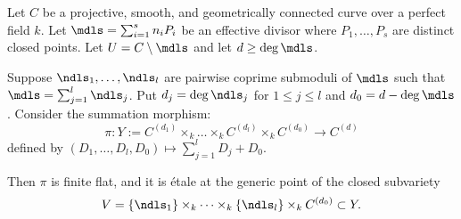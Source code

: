 \begin{lemma}\label{lemma:takeuchi_lemma}
     Let $C$ be a projective, smooth, and geometrically connected curve over a perfect field $k$.
     Let $\mdls = \sum_{i=1}^{s} n_i P_i$ be an effective divisor where $P_1, \dots, P_s$ are distinct closed points.
     Let $U = C \setminus \mdls$ and let $d \geq \deg \mdls$.

     Suppose $\ndls_1, \dots, \ndls_l$ are pairwise coprime submoduli of $\mdls$ such that $\mdls = \sum_{j=1}^l \ndls_j$.
     Put $d_j=\deg\ndls_j$ for $1\leq j\leq l$ and $d_0=d-\deg\mdls$.
     Consider the summation morphism:
     \[
     \pi : Y:=C^{(d_1)} \times_k \dots \times_k C^{(d_l)} \times_k C^{(d_0)} \longrightarrow C^{(d)}
     \]
     defined by $(D_1, \dots, D_l, D_0) \mapsto \sum_{j=1}^l D_j + D_0$.

     Then $\pi$ is finite flat, and it is étale at the generic point of the closed subvariety
     \[
     V = \{\ndls_1\} \times_k \dots \times_k \{\ndls_l\} \times_k C^{(d_0)}\subset Y.
     \]
\end{lemma}

